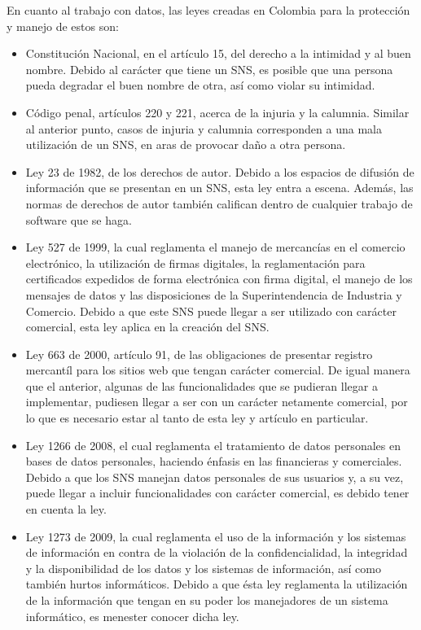 En cuanto al trabajo con datos, las leyes creadas en Colombia para la protección y manejo de estos son:

\begin{itemize}
  \item Constitución Nacional, en el artículo 15, del derecho a la intimidad y al buen nombre. Debido al carácter que tiene un SNS, es posible que una persona pueda degradar el buen nombre de otra, así como violar su intimidad.
  \item Código penal, artículos 220 y 221, acerca de la injuria y la calumnia. Similar al anterior punto, casos de injuria y calumnia corresponden a una mala utilización de un SNS, en aras de provocar daño a otra persona.
  \item Ley 23 de 1982, de los derechos de autor. Debido a los espacios de difusión de información que se presentan en un SNS, esta ley entra a escena. Además, las normas de derechos de autor también califican dentro de cualquier trabajo de software que se haga.
  \item Ley 527 de 1999, la cual reglamenta el manejo de mercancías en el comercio electrónico, la utilización de firmas digitales, la reglamentación para certificados expedidos de forma electrónica con firma digital, el manejo de los mensajes de datos y las disposiciones de la Superintendencia de Industria y Comercio. Debido a que este SNS puede llegar a ser utilizado con carácter comercial, esta ley aplica en la creación del SNS.
  \item Ley 663 de 2000, artículo 91, de las obligaciones de presentar registro mercantíl para los sitios web que tengan carácter comercial. De igual manera que el anterior, algunas de las funcionalidades que se pudieran llegar a implementar, pudiesen llegar a ser con un carácter netamente comercial, por lo que es necesario estar al tanto de esta ley y artículo en particular.
  \item Ley 1266 de 2008, el cual reglamenta el tratamiento de datos personales en bases de datos personales, haciendo énfasis en las financieras y comerciales. Debido a que los SNS manejan datos personales de sus usuarios y, a su vez, puede llegar a incluir funcionalidades con carácter comercial, es debido tener en cuenta la ley.
  \item Ley 1273 de 2009, la cual reglamenta el uso de la información y los sistemas de información en contra de la violación de la confidencialidad, la integridad y la disponibilidad de los datos y los sistemas de información, así como también hurtos informáticos. Debido a que ésta ley reglamenta la utilización de la información que tengan en su poder los manejadores de un sistema informático, es menester conocer dicha ley.

\end{itemize}

